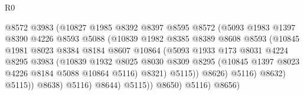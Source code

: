 \begin{lexlean}{R0}
\begin{coremodule}
                                    @8572
                                    @3983
                                    (@10827
                                      @1985
                                      @8392
                                      @8397
                                      @8595
                                      @8572
                                      (@5093
                                        @1983
                                        @1397
                                        @8390
                                        @4226
                                        @8593
                                        @5088
                                        (@10839
                                          @1982
                                          @8385
                                          @8389
                                          @8608
                                          @8593
                                          (@10845
                                            @1981
                                            @8023
                                            @8384
                                            @8184
                                            @8607
                                            @10864
                                            (@5093
                                              @1933
                                              @173
                                              @8031
                                              @4224
                                              @8295
                                              @3983
                                              (@10839
                                                @1932
                                                @8025
                                                @8030
                                                @8309
                                                @8295
                                                (@10845 @1397 @8023 @4226 @8184 @5088 @10864 @5116)
                                                @8321)
                                              @5115))
                                          @8626)
                                        @5116)
                                      @8632)
                                    @5115))
                                @8638)
                              @5116)
                            @8644)
                          @5115))
                      @8650)
                    @5116)
                  @8656)

\end{coremodule}
\end{lexlean}
